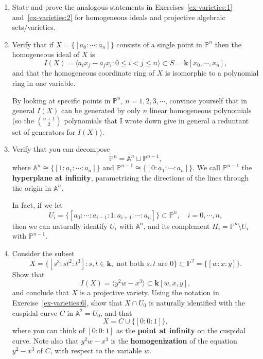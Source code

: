 \documentclass{article}
\theoremstyle{plain} %
\theoremstyle{definition}
\theoremstyle{remark}
\numberwithin{equation}{section}
\renewcommand{\k}{{\mathbf k}}
\newcommand{\defi}[1]{{\bf\upshape\sffamily #1}}
\newcommand{\bb}[1]{\mathbb{#1}}
\begin{document}
\begin{enumerate}
\item\label{ex-varieties:3} State and prove the analogous statements in Exercises~\ref{ex-varieties:1} and~\ref{ex-varieties:2} for homogeneous ideals and projective algebraic sets/varieties.

\item Verify that if $X= \{ [a_0:\cdots:a_n] \}$ consists of a single point in $\bb{P}^n$ then the homogeneous ideal of $X$ is
\[ I(X) = \langle a_i x_j - a_j x_i : 0\leq i<j \leq n \rangle \subset S = \k[x_0,\cdots,x_n],\]
and that the homogeneous coordinate ring of $X$ is isomorphic to a polynomial ring in one variable.

By looking at specific points in $\bb{P}^n$, $n=1,2,3,\cdots$, convince yourself that in general $I(X)$ can be generated by only $n$ linear homogeneous polynomials (so the $n+1\choose 2$ polynomials that I wrote down give in general a reduntant set of generators for $I(X)$).

\item\label{ex-varieties:6} Verify that you can decompose
\[ \bb{P}^n = \bb{A}^n \sqcup \bb{P}^{n-1},\]
where $\bb{A}^n \cong \{ [1:a_1:\cdots:a_n]\}$ and $\bb{P}^{n-1}\cong \{ [0:a_1:\cdots:a_n]\}$. We call $\bb{P}^{n-1}$ the \defi{hyperplane at infinity}, parametrizing the directions of the lines through the origin in $\bb{A}^n$.

In fact, if we let
\[ U_i = \{ [a_0:\cdots:a_{i-1}:1:a_{i+1}:\cdots:a_n] \} \subset \bb{P}^n,\quad i=0,\cdots,n,\]
then we can naturally identify $U_i$ with $\bb{A}^n$, and its complement $H_i = \bb{P}^n \setminus U_i$ with $\bb{P}^{n-1}$.

\item Consider the subset 
\[ X = \{ [s^3: st^2 : t^3] : s,t\in\k,\text{ not both $s,t$ are }0\} \subset \bb{P}^2 = \{ [w:x:y]\}.\]
Show that 
\[ I(X) = \langle y^2 w - x^3 \rangle \subset \k[w,x,y],\]
and conclude that $X$ is a projective variety. Using the notation in Exercise~\ref{ex-varieties:6}, show that $X \cap U_0$ is naturally identified with the cuspidal curve $C$ in $\bb{A}^2=U_0$, and that
\[ X = C \cup \{[0:0:1]\},\]
where you can think of $[0:0:1]$ as the \defi{point at infinity} on the cuspidal curve. Note also that $y^2w-x^3$ is the \defi{homogenization} of the equation $y^2-x^3$ of $C$, with respect to the variable $w$.

\end{enumerate}
\end{document}
